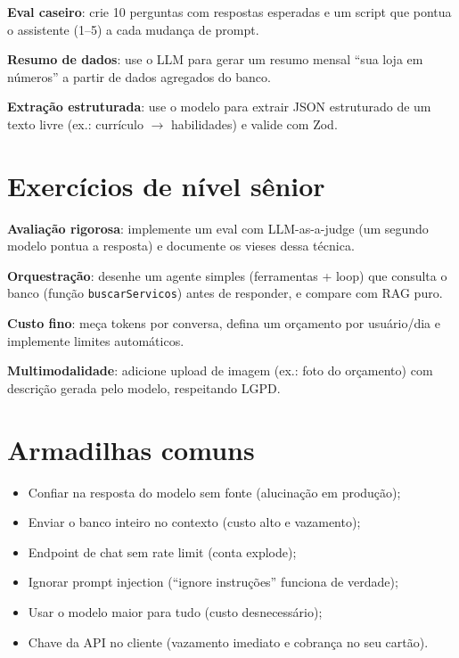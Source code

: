 \begin{desafios}
  \item \textbf{Eval caseiro}: crie 10 perguntas com respostas esperadas e um script que pontua o assistente (1--5) a cada mudança de prompt.
  \item \textbf{Resumo de dados}: use o LLM para gerar um resumo mensal ``sua loja em números'' a partir de dados agregados do banco.
  \item \textbf{Extração estruturada}: use o modelo para extrair JSON estruturado de um texto livre (ex.: currículo $\rightarrow$ habilidades) e valide com Zod.
\end{desafios}

\section{Exercícios de nível sênior}

\begin{seniores}
  \item \textbf{Avaliação rigorosa}: implemente um eval com LLM-as-a-judge (um segundo modelo pontua a resposta) e documente os vieses dessa técnica.
  \item \textbf{Orquestração}: desenhe um agente simples (ferramentas + loop) que consulta o banco (função \texttt{buscarServicos}) antes de responder, e compare com RAG puro.
  \item \textbf{Custo fino}: meça tokens por conversa, defina um orçamento por usuário/dia e implemente limites automáticos.
  \item \textbf{Multimodalidade}: adicione upload de imagem (ex.: foto do orçamento) com descrição gerada pelo modelo, respeitando LGPD.
\end{seniores}

\section{Armadilhas comuns}

\begin{itemize}[leftmargin=*, itemsep=0.4em]
  \item Confiar na resposta do modelo sem fonte (alucinação em produção);
  \item Enviar o banco inteiro no contexto (custo alto e vazamento);
  \item Endpoint de chat sem rate limit (conta explode);
  \item Ignorar prompt injection (``ignore instruções'' funciona de verdade);
  \item Usar o modelo maior para tudo (custo desnecessário);
  \item Chave da API no cliente (vazamento imediato e cobrança no seu cartão).
\end{itemize}

